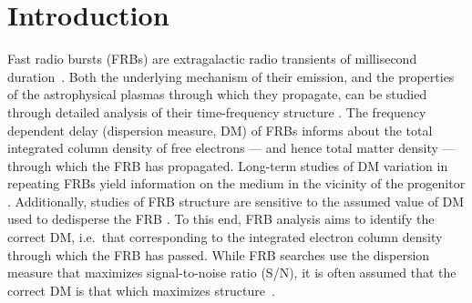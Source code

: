 \documentclass[twocolumn]{aastex631}
\begin{document}
\begin{abstract}
Studies of the time-domain structure of fast radio bursts (FRBs) require an accurate estimate of the FRB dispersion measure in order to recover the intrinsic burst shape. Furthermore, the exact DM is itself of interest when studying the time-evolution of the medium through which multiple bursts from repeating FRBs propagate.
A commonly used approach to obtain the
dispersion measure is to take the value that maximizes the FRB structure in the time domain.
However, various authors use differing methods to obtain this structure parameter, and do not document the smoothing method used. Furthermore, there are no quantitative estimates of the error in this procedure in the FRB literature. In this letter, we present a smoothing filter based on the discrete cosine transform, and show that computing the structure parameter by summing the squares of the derivatives and taking the square root (that is, the 2-norm,  $\sqrt{\Sigma (d/dt)^2}$) immediately lends itself to calculation of uncertainty of the structure parameter. We illustrate this with FRB181112 and FRB210117 data, which were detected by the Australian Square Kilometre Array Pathfinder, and for which high-time-resolution data is available.

\end{abstract}




\section{Introduction} \label{sec:intro}

Fast radio bursts (FRBs) are extragalactic radio transients of millisecond duration~\citep{Lorimer2007}. Both the underlying mechanism of their emission, and the properties of the astrophysical plasmas through which they propagate, can be studied through detailed analysis of their time-frequency structure \citep[e.g.][]{Michilli2018_121102,Macquart2020}. The frequency dependent delay (dispersion measure, DM) of FRBs informs about the total integrated column density of free electrons --- and hence total matter density --- through which the FRB has propagated. Long-term studies of DM variation in repeating FRBs yield information on the medium in the vicinity of the progenitor \citep[e.g.][]{Zhao2021_DM_evolution}. Additionally, studies of FRB structure are sensitive to the assumed value of DM used to dedisperse the FRB \citep[e.g.][]{Hessels_2019}.
To this end, FRB analysis aims to identify the correct DM, i.e.\ that corresponding to the integrated electron column density through which the FRB has passed. While FRB searches use
the dispersion measure that maximizes signal-to-noise ratio (S/N),
it is often assumed that the correct DM is that which maximizes structure~\citep{Caleb_10.1093/mnras/staa1791, Hilmarsson_10.1093/mnras/stab2936, 2021MNRAS.505.3041P}.
\end{document}
